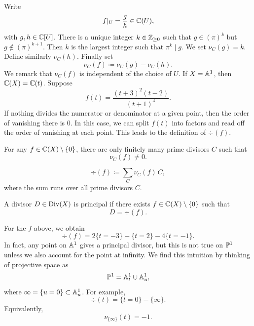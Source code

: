 Write
\[
    f|_U = \frac{g}{h}\in \c(U),
\]
with $g,h\in \c[U]$.
There is a unique integer $k\in \z_{\geq 0}$ such that $g\in (\pi)^k$ but $g\notin (\pi)^{k+1}$.
Then $k$ is the largest integer such that $\pi^k \mid g$.
We set $\nu_C(g) = k$.
Define similarly $\nu_C(h)$.
Finally set
\[
    \nu_C(f) \coloneqq \nu_C(g) - \nu_C(h).
\]
We remark that $\nu_C(f)$ is independent of the choice of $U$.
If $X = \aa^1$, then $\c(X) = \c(t)$.
Suppose
\[
    f(t) = \frac{(t+3)^2(t-2)}{(t+1)^4}.
\]
If nothing divides the numerator or denominator at a given point, then the order of vanishing there is $0$.
In this case, we can split $f(t)$ into factors and read off the order of vanishing at each point.
This leads to the definition of $\div(f)$.

\begin{proposition*}{
    For any $f\in \c(X)\setminus\{0\}$, there are only finitely many prime divisors $C$ such that
    \[
        \nu_C(f)\neq 0.
    \]
}
\end{proposition*}

\begin{definition}[Divisor of $f$]
    \[
        \div(f) \coloneqq \sum_C \nu_C(f)\,C,
    \]
    where the sum runs over all prime divisors $C$.
\end{definition}

\begin{definition}
    A divisor $D\in \Div(X)$ is principal if there exists $f\in \c(X)\setminus\{0\}$ such that
    \[
        D = \div(f).
    \]
\end{definition}

For the $f$ above, we obtain
\[
    \div(f) = 2\{t = -3\} + \{t = 2\} - 4\{t = -1\}.
\]
In fact, any point on $\aa^1$ gives a principal divisor, but this is not true on $\pp^1$ unless we also account for the point at infinity.
We find this intuition by thinking of projective space as
\[
    \pp^1 = \aa^1_t \cup \aa^1_u,
\]
where $\infty = \{u = 0\}\subset \aa^1_u$.
For example,
\[
    \div(t) = \{t = 0\} - \{\infty\}.
\]
Equivalently,
\[
    \nu_{\{\infty\}}(t) = -1.
\]